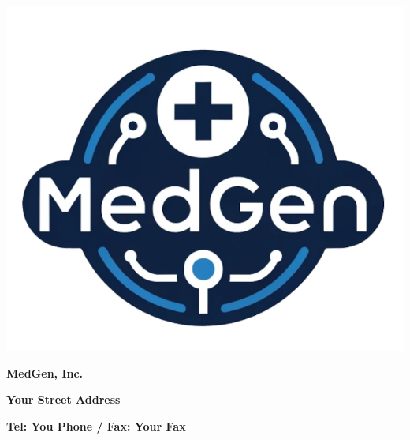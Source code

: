 \documentclass[12pt]{report}
\newcommand{\mytitle}[1]{\LARGE \textbf{#1}\par}
\newcommand{\mysubtitle}[1]{\large\textbf{#1}\par}
\begin{document}
        \noindent%
        \begin{minipage}[t]{.2\textwidth}
\vspace{1pt}\includegraphics[width=0.7\linewidth]{media/image1.png}
        \end{minipage}%
        \noindent%
        \begin{minipage}[t]{.7\textwidth}
                \vspace{1pt}
		\begin{center}
		\mytitle{MedGen, Inc.}
                \mysubtitle{\normalsize Your Street Address}
                \mysubtitle{\normalsize Tel: You Phone / Fax: Your Fax}
		\end{center}
        \end{minipage}%

        \bigskip
        \noindent 
        
	
	\vspace{\baselineskip}

	 	                
\end{document}
